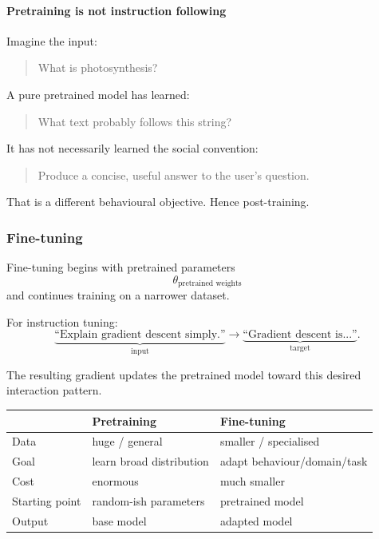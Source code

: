 \paragraph*{Pretraining is not instruction following}
Imagine the input:
\begin{quote}
What is photosynthesis?
\end{quote}

A pure pretrained model has learned:

\begin{quote}
What text probably follows this string?
\end{quote}

It has not necessarily learned the social convention:

\begin{quote}
Produce a concise, useful answer to the user's question.
\end{quote}

That is a different behavioural objective.
Hence post-training.

\subsubsection{Fine-tuning}
\label{subsec:modern-finetuning}
Fine-tuning begins with pretrained parameters
\[
\theta_{\text{pretrained weights}}
\]
and continues training on a narrower dataset.

For instruction tuning:
\[
\underbrace{\text{``Explain gradient descent simply.''}}_{\text{input}}
\longrightarrow
\underbrace{\text{``Gradient descent is...''}}_{\text{target}}.
\]

The resulting gradient updates the pretrained model toward this desired interaction pattern.

\begin{center}
\small
\begin{tabularx}{.91\linewidth}{@{}L{.22\linewidth}YY@{}}
\toprule
 & \textbf{Pretraining} & \textbf{Fine-tuning} \\
\midrule
Data & huge / general & smaller / specialised \\
Goal & learn broad distribution & adapt behaviour/domain/task \\
Cost & enormous & much smaller \\
Starting point & random-ish parameters & pretrained model \\
Output & base model & adapted model \\
\bottomrule
\end{tabularx}
\end{center}

